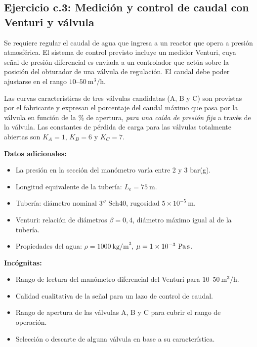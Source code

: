 \documentclass[12pt, a4paper]{article}
\begin{document}

\subsection*{Ejercicio c.3: Medición y control de caudal con Venturi y válvula}

Se requiere regular el caudal de agua que ingresa a un reactor que opera a
presión atmosférica. El sistema de control previsto incluye un medidor Venturi,
cuya señal de presión diferencial es enviada a un controlador que actúa sobre la
posición del obturador de una válvula de regulación. El caudal debe poder
ajustarse en el rango $10\text{–}50\ \text{m}^3/\text{h}$.

Las curvas características de tres válvulas candidatas (A, B y C) son provistas
por el fabricante y expresan el porcentaje del caudal máximo que pasa por la
válvula en función de la \% de apertura, \emph{para una caída de presión fija}
a través de la válvula. Las constantes de pérdida de carga para las válvulas
totalmente abiertas son $K_A=1$, $K_B=6$ y $K_C=7$.

\bigskip

\noindent\textbf{Datos adicionales:}
\begin{itemize}
  \item La presión en la sección del manómetro varía entre 2 y 3 bar(g).
  \item Longitud equivalente de la tubería: $L_e = 75\ \text{m}$.
  \item Tubería: diámetro nominal $3''$ Sch40, rugosidad $5\times 10^{-5}\ \text{m}$.
  \item Venturi: relación de diámetros $\beta = 0{,}4$, diámetro máximo igual al de la tubería.
  \item Propiedades del agua: $\rho = 1000\ \text{kg/m}^3$, $\mu = 1\times 10^{-3}\ \text{Pa\,s}$.
\end{itemize}

\noindent\textbf{Incógnitas:}
\begin{itemize}
  \item[(a)] Rango de lectura del manómetro diferencial del Venturi para $10\text{–}50\ \text{m}^3/\text{h}$.
  \item[(a)] Calidad cualitativa de la señal para un lazo de control de caudal.
  \item[(b)] Rango de apertura de las válvulas A, B y C para cubrir el rango de operación.
  \item[(b)] Selección o descarte de alguna válvula en base a su característica.
\end{itemize}
\end{document}
